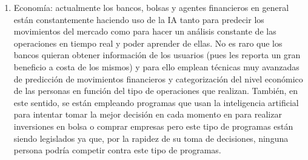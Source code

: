 \begin{enumerate}
  \item Economía: actualmente los bancos, bolsas y agentes financieros en general están constantemente haciendo uso de la IA tanto para predecir los movimientos del mercado como para hacer un análisis constante de las operaciones en tiempo real y poder aprender de ellas. No es raro que los bancos quieran obtener información de los usuarios (pues les reporta un gran beneficio a costa de los mismos) y para ello emplean técnicas muy avanzadas de predicción de movimientos financieros y categorización del nivel económico de las personas en función del tipo de operaciones que realizan. También, en este sentido, se están empleando programas que usan la inteligencia artificial para intentar tomar la mejor decisión en cada momento en para realizar inversiones en bolsa o comprar empresas pero este tipo de programas están siendo legislados ya que, por la rapidez de su toma de decisiones, ninguna persona podría competir contra este tipo de programas.
\end{enumerate}
